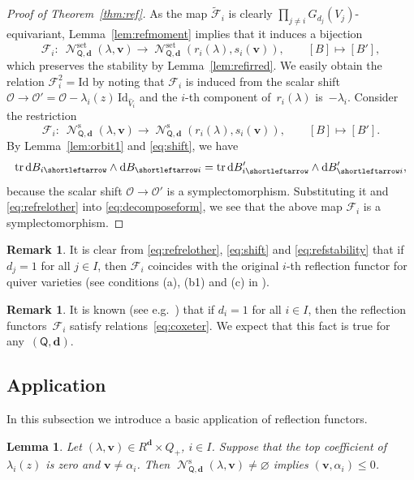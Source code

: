 \documentclass[pdftex]{sigma}
\newcommand{\slar}{\shortleftarrow}
\numberwithin{equation}{section}
\newtheorem{Lemma}[Theorem]{Lemma}
\theoremstyle{definition}
\newtheorem{Remark}[Theorem]{Remark}
\newcommand{\thmref}[1]{Theo\-rem~\ref{#1}}
\newcommand{\lemref}[1]{Lemma~\ref{#1}}
\newcommand{\tr}{\operatorname{tr}}
\newcommand{\unit}{\mathrm{Id}}
\newcommand{\bv}{\mathbf{v}}
\newcommand{\ved}{\mathbf{d}}
\newcommand{\bO}{\mathcal{O}}
\newcommand{\Qst}{\operatorname{\mathscr{N}}^\mathrm{s}}
\newcommand{\Qset}{\operatorname{\mathscr{N}}^\mathrm{set}}
\newcommand{\QQ}{\mathsf{Q}} %
\newcommand{\frF}{\mathscr{F}} %
\newcommand{\rd}{\mathop{\mathrm{d}\!}\mathstrut}
\begin{document}
\begin{proof}[Proof of \thmref{thm:ref}]
As the map $\widetilde{\frF}_i$ is clearly
$\prod\limits_{j \neq i}G_{d_j}(V_j)$-equivariant,
\lemref{lem:refmoment} implies
that it induces a bijection
\[
\frF_i \colon \  \Qset_{\QQ,\ved}(\lambda,\bv) \to \Qset_{\QQ,\ved}(r_i(\lambda),s_i(\bv)),
\qquad [B] \mapsto [B'],
\]
which preserves the stability by \lemref{lem:refirred}.
We easily obtain the relation $\frF_i^2 = \unit$
by noting that $\frF_i$ is induced from the scalar shift
$\bO \to \bO'=\bO -\lambda_i(z)\,\unit_{\widehat{V}_i}$
and the $i$-th component of~$r_i(\lambda)$ is~$-\lambda_i$.
Consider the restriction
\[
\frF_i \colon \ \Qst_{\QQ,\ved}(\lambda,\bv) \to \Qst_{\QQ,\ved}(r_i(\lambda),s_i(\bv)),
\qquad [B] \mapsto [B'].
\]
By \lemref{lem:orbit1} and \eqref{eq:shift},
we have
\[
\tr \rd B_{i \slar} \wedge \rd B_{\slar i} =
\tr \rd B'_{i \slar} \wedge \rd B'_{\slar i},
\]
because the scalar shift
$\bO \to \bO'$
is a symplectomorphism.
Substituting it and \eqref{eq:refrelother}
into \eqref{eq:decomposeform},
we see that the above map $\frF_i$
is a symplectomorphism.
\end{proof}

\begin{Remark}\label{rem:original-ref}
It is clear from \eqref{eq:refrelother}, \eqref{eq:shift}
and \eqref{eq:refstability} that if $d_j=1$ for all $j \in I$,
then $\frF_i$ coincides with the original $i$-th ref\/lection functor
for quiver varieties
(see conditions (a), (b1) and (c) in \cite[Section 3]{MR1623674}).
\end{Remark}

\begin{Remark}\label{rem:ref-relation}
It is known (see e.g.\ \cite{MR1775358}) that if $d_i=1$ for all $i \in I$,
then the ref\/lection functors~$\frF_i$ satisfy relations~\eqref{eq:coxeter}.
We expect that this fact is true for any~$(\QQ,\ved)$.
\end{Remark}

\subsection{Application}\label{subsec:app}

In this subsection we introduce a basic application of ref\/lection functors.

\begin{Lemma}
Let $(\lambda,\bv) \in R^\ved \times Q_+$, $i \in I$.
Suppose that the top coefficient of $\lambda_i(z)$ is zero
and $\bv \neq \alpha_i$.
Then $\Qst_{\QQ,\ved}(\lambda,\bv) \neq \varnothing$ implies $(\bv,\alpha_i) \leq 0$.
\end{Lemma}
\end{document}
